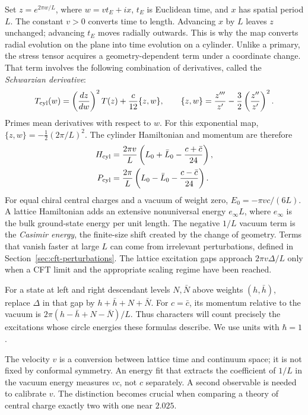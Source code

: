 Set $z=e^{2\pi w/L}$, where $w=vt_E+ix$, $t_E$ is Euclidean
time, and $x$ has spatial period $L$. The constant $v>0$ converts
time to length. Advancing $x$ by $L$ leaves $z$ unchanged; advancing
$t_E$ moves radially outwards. This is why the map converts radial
evolution on the plane into time evolution on a cylinder.
Unlike a primary, the stress tensor acquires a geometry-dependent
term under a coordinate change. That term involves the following
combination of derivatives, called the \emph{Schwarzian derivative}:
\[
 T_{\rm cyl}(w)=\left(\frac{dz}{dw}\right)^2T(z)
                   +\frac c{12}\{z,w\},
 \qquad
 \{z,w\}=\frac{z'''}{z'}-\frac32\left(\frac{z''}{z'}\right)^2.
\]
Primes mean derivatives with respect to $w$.
For this exponential map,
$\{z,w\}=-\tfrac12(2\pi/L)^2$. The cylinder Hamiltonian and
momentum are therefore
\begin{align}
 H_{\rm cyl}&=\frac{2\pi v}{L}
       \left(L_0+\bar L_0-\frac{c+\bar c}{24}\right),
 \label{eq:cft-cylinder}\\
 P_{\rm cyl}&=\frac{2\pi}{L}
       \left(L_0-\bar L_0-\frac{c-\bar c}{24}\right).
\end{align}
For equal chiral central charges and a vacuum of weight zero,
$E_0=-\pi vc/(6L)$. A lattice Hamiltonian adds an extensive
nonuniversal energy $e_\infty L$, where $e_\infty$ is the bulk
ground-state energy per unit length. The negative $1/L$ vacuum term
is the \emph{Casimir energy}, the finite-size shift created by the
change of geometry. Terms that vanish faster at large $L$ can come
from irrelevant perturbations, defined in
Section~\ref{sec:cft-perturbations}. The lattice
excitation gaps approach $2\pi v\Delta/L$ only when a CFT limit
and the appropriate scaling regime have been reached.

For a state at left and right descendant levels $N,\bar N$ above
weights $(h,\bar h)$, replace $\Delta$ in that gap by
$h+\bar h+N+\bar N$. For $c=\bar c$, its momentum relative to
the vacuum is $2\pi(h-\bar h+N-\bar N)/L$. Thus characters will
count precisely the excitations whose circle energies these formulas
describe. We use units with $\hbar=1$.

The velocity $v$ is a conversion between lattice time and continuum
space; it is not fixed by conformal symmetry. An energy fit that
extracts the coefficient of $1/L$ in the vacuum energy measures
$vc$, not $c$ separately. A second observable is needed to calibrate
$v$. The distinction becomes crucial when comparing a theory of
central charge exactly two with one near $2.025$.

